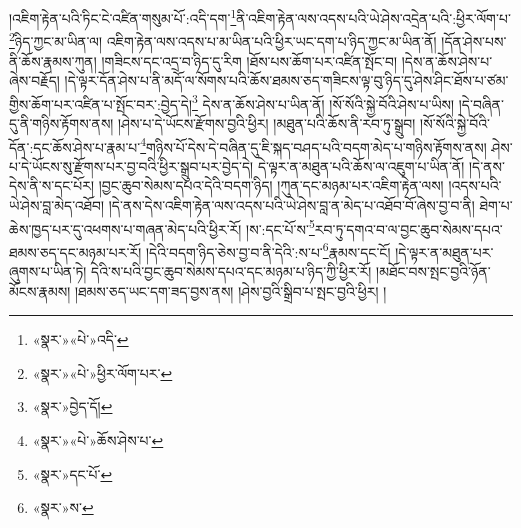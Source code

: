 །འཇིག་རྟེན་པའི་ཏིང་ངེ་འཛིན་གསུམ་པོ་:འདི་དག་\footnote{«སྣར་»«པེ་»འདི་}ནི་འཇིག་རྟེན་ལས་འདས་པའི་ཡེ་ཤེས་འདྲེན་པའི་:ཕྱིར་ལོག་པ་\footnote{«སྣར་»«པེ་»ཕྱིར་ལོག་པར་}ཉིད་ཀྱང་མ་ཡིན་ལ། འཇིག་རྟེན་ལས་འདས་པ་མ་ཡིན་པའི་ཕྱིར་ཡང་དག་པ་ཉིད་ཀྱང་མ་ཡིན་ནོ། །དོན་ཤེས་པས་ནི་ཆོས་རྣམས་ཀུན། །གཟིངས་དང་འདྲ་བ་ཉིད་དུ་རིག །ཐོས་པས་ཆོག་པར་འཛིན་སྤོང་བ། །དེས་ན་ཆོས་ཤེས་པ་ཞེས་བརྗོད། །དེ་ལྟར་དོན་ཤེས་པ་ནི་མདོ་ལ་སོགས་པའི་ཆོས་ཐམས་ཅད་གཟིངས་ལྟ་བུ་ཉིད་དུ་ཤེས་ཤིང་ཐོས་པ་ཙམ་གྱིས་ཆོག་པར་འཛིན་པ་སྤོང་བར་:བྱེད་དེ།\footnote{«སྣར་»བྱེད་དོ།} དེས་ན་ཆོས་ཤེས་པ་ཡིན་ནོ། །སོ་སོའི་སྐྱེ་བོའི་ཤེས་པ་ཡིས། །དེ་བཞིན་དུ་ནི་གཉིས་རྟོགས་ནས། །ཤེས་པ་དེ་ཡོངས་རྫོགས་བྱའི་ཕྱིར། །མཐུན་པའི་ཆོས་ནི་རབ་ཏུ་སྒྲུབ། །སོ་སོའི་སྐྱེ་བོའི་དོན་:དང་ཆོས་ཤེས་པ་རྣམ་པ་\footnote{«སྣར་»«པེ་»ཆོས་ཤེས་པ་}གཉིས་པོ་དེས་དེ་བཞིན་དུ་ཇི་སྐད་བཤད་པའི་བདག་མེད་པ་གཉིས་རྟོགས་ནས། ཤེས་པ་དེ་ཡོངས་སུ་རྫོགས་པར་བྱ་བའི་ཕྱིར་སྒྲུབ་པར་བྱེད་དེ། དེ་ལྟར་ན་མཐུན་པའི་ཆོས་ལ་འཇུག་པ་ཡིན་ནོ། །དེ་ནས་དེས་ནི་ས་དང་པོར། །བྱང་ཆུབ་སེམས་དཔའ་དེའི་བདག་ཉིད། །ཀུན་དང་མཉམ་པར་འཇིག་རྟེན་ལས། །འདས་པའི་ཡེ་ཤེས་བླ་མེད་འཐོབ། །དེ་ནས་དེས་འཇིག་རྟེན་ལས་འདས་པའི་ཡེ་ཤེས་བླ་ན་མེད་པ་འཐོབ་བོ་ཞེས་བྱ་བ་ནི། ཐེག་པ་ཆེས་ཁྱད་པར་དུ་འཕགས་པ་གཞན་མེད་པའི་ཕྱིར་རོ། །ས་:དང་པོ་ས་\footnote{«སྣར་»དང་པོ་}རབ་ཏུ་དགའ་བ་ལ་བྱང་ཆུབ་སེམས་དཔའ་ཐམས་ཅད་དང་མཉམ་པར་རོ། །དེའི་བདག་ཉིད་ཅེས་བྱ་བ་ནི་དེའི་:ས་པ་\footnote{«སྣར་»ས་}རྣམས་དང་ངོ། །དེ་ལྟར་ན་མཐུན་པར་ཞུགས་པ་ཡིན་ཏེ། དེའི་ས་པའི་བྱང་ཆུབ་སེམས་དཔའ་དང་མཉམ་པ་ཉིད་ཀྱི་ཕྱིར་རོ། །མཐོང་བས་སྤང་བྱའི་ཉོན་མོངས་རྣམས། །ཐམས་ཅད་ཡང་དག་ཟད་བྱས་ནས། །ཤེས་བྱའི་སྒྲིབ་པ་སྤང་བྱའི་ཕྱིར། །
